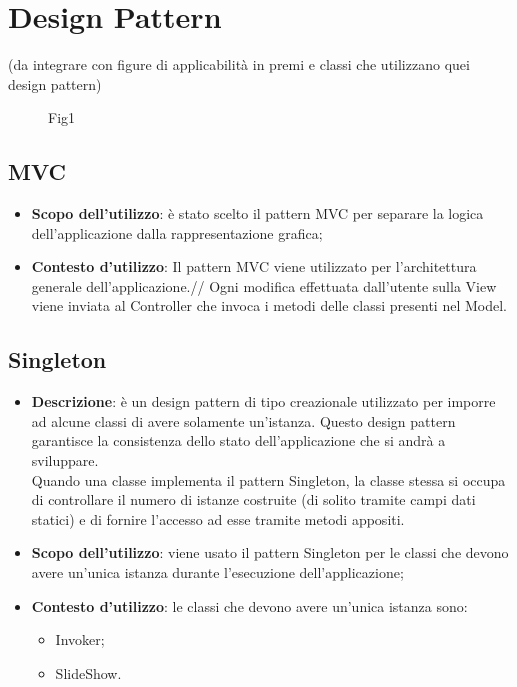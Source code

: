 \section{Design Pattern}{
	(da integrare con figure di applicabilità in premi e classi che utilizzano quei design pattern)
	\begin{figure}
		\centering
		\label{fig:fig1}
		\caption{Fig1}
	\end{figure}
	\subsection{MVC}{
			\begin{itemize}
				\item \textbf{Scopo dell’utilizzo}: è stato scelto il pattern MVC per separare la logica dell'applicazione dalla rappresentazione grafica;
				\item \textbf{Contesto d’utilizzo}: Il pattern MVC viene utilizzato per l'architettura generale dell'applicazione.//
				Ogni modifica effettuata dall'utente sulla View viene inviata al Controller che invoca i metodi delle classi presenti nel Model.
			\end{itemize}
		}
		
	\subsection{Singleton}{
		\begin{itemize}
			\item \textbf{Descrizione}: è un design pattern di tipo creazionale utilizzato per imporre ad alcune classi di avere solamente un'istanza. Questo design pattern garantisce la consistenza dello stato dell'applicazione che si andrà a sviluppare.\\
			Quando una classe implementa il pattern Singleton, la classe stessa si occupa di controllare il numero di istanze costruite (di solito tramite campi dati statici) e di fornire l'accesso ad esse tramite metodi appositi.\\
			\item \textbf{Scopo dell’utilizzo}: viene usato il pattern Singleton per le classi che devono avere un'unica istanza durante l'esecuzione dell'applicazione;
			\item \textbf{Contesto d’utilizzo}: le classi che devono avere un’unica istanza sono:
			\begin{itemize}
				\item Invoker;
				\item SlideShow.
			\end{itemize}

\end{itemize}}}
